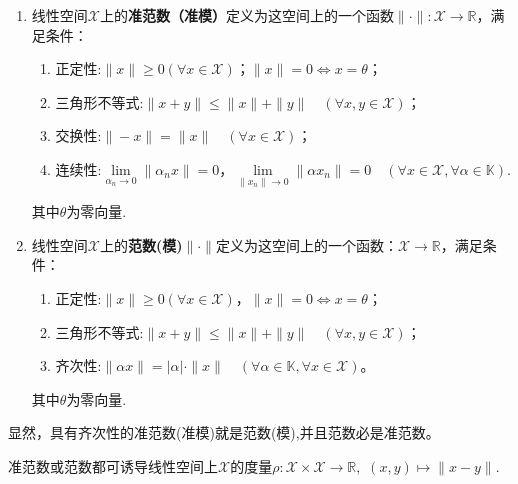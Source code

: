 \documentclass[../../main.tex]{subfiles}%
\begin{document}
\begin{definition}
\begin{enumerate}
\item 线性空间$\mathscr{X}$上的\textbf{准范数（准模）}定义为这空间上的一个函数$\|\cdot\|:\mathscr{X}\to\mathbb{R}$，满足条件：
\begin{enumerate}[(1)]
\item 正定性:$\|x\|\geqslant0(\forall x\in\mathscr{X})$；$\|x\|=0\iff x=\theta$；

\item 三角形不等式:$\|x+y\|\leqslant\|x\|+\|y\|\quad(\forall x,y\in\mathscr{X})$；

\item 交换性:$\|-x\|=\|x\|\quad(\forall x\in\mathscr{X})$；

\item 连续性:$\lim\limits_{\alpha_n\to0}\|\alpha_n x\|=0$，$\lim\limits_{\|x_n\|\to0}\|\alpha x_n\|=0\quad(\forall x\in\mathscr{X},\forall\alpha\in\mathbb{K})$.
\end{enumerate}
其中$\theta$为零向量.

\item 线性空间$\mathscr{X}$上的\textbf{范数(模)}$\|\cdot\|$定义为这空间上的一个函数：$\mathscr{X}\to\mathbb{R}$，满足条件：
\begin{enumerate}[(1)]
\item 正定性:$\|x\|\geqslant0(\forall x\in\mathscr{X})$，$\|x\|=0\iff x=\theta$；
\item 三角形不等式:$\|x+y\|\leqslant\|x\|+\|y\|\quad(\forall x,y\in\mathscr{X})$；
\item 齐次性:$\|\alpha x\|=|\alpha|\cdot\|x\|\quad(\forall\alpha\in\mathbb{K},\forall x\in\mathscr{X})$。
\end{enumerate}
其中$\theta$为零向量.
\end{enumerate}
\end{definition}
\begin{remark}
显然，具有齐次性的准范数(准模)就是范数(模),并且范数必是准范数。

准范数或范数都可诱导线性空间上$\mathscr{X}$的度量$\rho:\mathscr{X}\times \mathscr{X}\to \mathbb{R},\,\,(x,y)\mapsto \|x-y\|$.
\end{remark}
\end{document}
